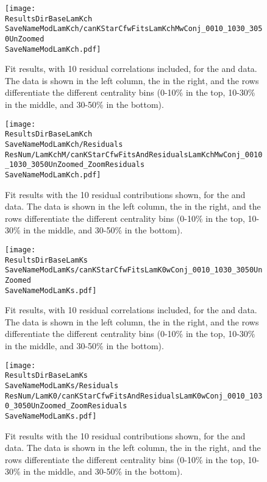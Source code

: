 \documentclass[/home/jesse/Analysis/FemtoAnalysis/AnalysisNotes/AnalysisNoteJBuxton.tex]{subfiles}
\renewcommand{\NonFlatBgdLamKch}{_NonFlatBgdCrctnLamK0LinearLamKchPolynomial}
\renewcommand{\NonFlatBgdLamKs}{_NonFlatBgdCrctnLamK0LinearLamKchPolynomial}
\renewcommand{\ResNum}{_10Res}
\renewcommand{\PrimMaxDecay}{_PrimMaxDecay4fm}
\renewcommand{\SaveNameModLamKch}{\MomRes\NonFlatBgdLamKch\ResNum\PrimMaxDecay\ResMethod\ParamFixAndShareLamKch}
\renewcommand{\SaveNameModLamKs}{\MomRes\NonFlatBgdLamKs\ResNum\PrimMaxDecay\ResMethod\ParamFixAndShareLamKch}
\begin{document}
\begin{figure}[h]
  \centering
  \texttt{[image: \\ResultsDirBaseLamKch\\SaveNameModLamKch/canKStarCfwFitsLamKchMwConj\_0010\_1030\_3050UnZoomed\\SaveNameModLamKch.pdf]}
  \caption[\LamKchMALamKchP data with fits: 10 residuals]
  {
  Fit results, with 10 residual correlations included, for the \LamKchM and \ALamKchP data.
  The \LamKchM data is shown in the left column, the \ALamKchP in the right, and the rows differentiate the different centrality bins (0-10\% in the top, 10-30\% in the middle, and 30-50\% in the bottom).
  }
  \label{figApp:LamKchMwConjFits_10Res}
\end{figure}


\begin{figure}[h]
  \centering
  \texttt{[image: \\ResultsDirBaseLamKch\\SaveNameModLamKch/Residuals\\ResNum/LamKchM/canKStarCfwFitsAndResidualsLamKchMwConj\_0010\_1030\_3050UnZoomed\_ZoomResiduals\\SaveNameModLamKch.pdf]}
  \caption[\LamKchMALamKchP fit contribution from residuals: 10 residuals]
  {
  Fit results with the 10 residual contributions shown, for the \LamKchM and \ALamKchP data.
  The \LamKchM data is shown in the left column, the \ALamKchP in the right, and the rows differentiate the different centrality bins (0-10\% in the top, 10-30\% in the middle, and 30-50\% in the bottom).
  }
  \label{figApp:LamKchMwConjFitsAndResiduals_10Res}
\end{figure}




\begin{figure}[h]
  \centering
  \texttt{[image: \\ResultsDirBaseLamKs\\SaveNameModLamKs/canKStarCfwFitsLamK0wConj\_0010\_1030\_3050UnZoomed\\SaveNameModLamKs.pdf]}
  \caption[\LamALamKs data with fits: 10 residuals]
  {
  Fit results, with 10 residual correlations included, for the \LamKs and \ALamKs data.
  The \LamKs data is shown in the left column, the \ALamKs in the right, and the rows differentiate the different centrality bins (0-10\% in the top, 10-30\% in the middle, and 30-50\% in the bottom).
  }
  \label{figApp:LamKswConjFits_10Res}
\end{figure}


\begin{figure}[h]
  \centering
  \texttt{[image: \\ResultsDirBaseLamKs\\SaveNameModLamKs/Residuals\\ResNum/LamK0/canKStarCfwFitsAndResidualsLamK0wConj\_0010\_1030\_3050UnZoomed\_ZoomResiduals\\SaveNameModLamKs.pdf]}
  \caption[\LamKsALamKs fit contribution from residuals: 10 residuals]
  {
  Fit results with the 10 residual contributions shown, for the \LamKs and \ALamKs data.
  The \LamKs data is shown in the left column, the \ALamKs in the right, and the rows differentiate the different centrality bins (0-10\% in the top, 10-30\% in the middle, and 30-50\% in the bottom).
  }
  \label{figApp:LamKswConjFitsAndResiduals_10Res}
\end{figure}
\end{document}
